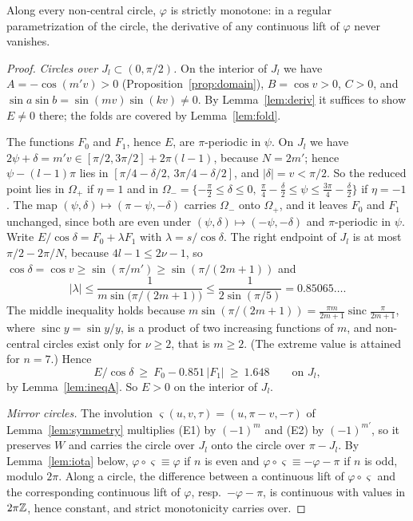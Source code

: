 \begin{theorem}\label{thm:noncentral}
Along every non-central circle, $\varphi$ is strictly monotone: in a regular parametrization of the circle, the
derivative of any continuous lift of $\varphi$ never vanishes.
\end{theorem}

\begin{proof}
\emph{Circles over $J_l\subset(0,\pi/2)$.} On the interior of $J_l$ we have $A=-\cos(m'v)>0$ (Proposition~\ref{prop:domain}),
$B=\cos v>0$, $C>0$, and $\sin a\sin b=\sin(mv)\sin(kv)\neq0$. By Lemma~\ref{lem:deriv} it suffices to show $E\neq0$ there;
the folds are covered by Lemma~\ref{lem:fold}.

The functions $F_0$ and $F_1$, hence $E$, are $\pi$-periodic in $\psi$. On $J_l$ we have
$2\psi+\delta=m'v\in[\pi/2,3\pi/2]+2\pi(l-1)$, because $N=2m'$; hence $\psi-(l-1)\pi$ lies in
$[\pi/4-\delta/2,\,3\pi/4-\delta/2]$, and $|\delta|=v<\pi/2$. So the reduced point lies in $\Omega_+$ if $\eta=1$ and in
$\Omega_-=\{-\frac\pi2\le\delta\le0,\ \frac\pi4-\frac\delta2\le\psi\le\frac{3\pi}4-\frac\delta2\}$ if $\eta=-1$. The map $(\psi,\delta)\mapsto(\pi-\psi,-\delta)$
carries $\Omega_-$ onto $\Omega_+$, and it leaves $F_0$ and $F_1$ unchanged, since both are even under
$(\psi,\delta)\mapsto(-\psi,-\delta)$ and $\pi$-periodic in $\psi$. Write $E/\cos\delta=F_0+\lambda F_1$ with $\lambda=s/\cos\delta$. The right endpoint of $J_l$ is at most
$\pi/2-2\pi/N$, because $4l-1\le2\nu-1$, so $\cos\delta=\cos v\ge\sin(\pi/m')\ge\sin(\pi/(2m+1))$ and
\[
|\lambda|\le\frac{1}{m\sin\bigl(\pi/(2m+1)\bigr)}\le\frac{1}{2\sin(\pi/5)}=0.85065\ldots .
\]
The middle inequality holds because $m\sin(\pi/(2m+1))=\frac{\pi m}{2m+1}\operatorname{sinc}\frac{\pi}{2m+1}$, where $\operatorname{sinc}y=\sin y/y$,
is a product of two increasing functions of $m$, and non-central circles exist only for $\nu\ge2$, that is $m\ge2$. (The extreme value
is attained for $n=7$.) Hence
\[
E/\cos\delta\ \ge\ F_0-0.851\,|F_1|\ \ge\ 1.648\qquad\text{on }J_l,
\]
by Lemma~\ref{lem:ineqA}. So $E>0$ on the interior of $J_l$.

\emph{Mirror circles.} The involution $\varsigma(u,v,\tau)=(u,\pi-v,-\tau)$ of Lemma~\ref{lem:symmetry} multiplies (E1) by
$(-1)^m$ and (E2) by $(-1)^{m'}$, so it preserves $W$ and carries the circle over $J_l$ onto the circle over $\pi-J_l$. By
Lemma~\ref{lem:iota} below, $\varphi\circ\varsigma\equiv\varphi$ if $n$ is even and $\varphi\circ\varsigma\equiv-\varphi-\pi$ if $n$ is odd,
modulo $2\pi$. Along a circle, the difference between a continuous lift of $\varphi\circ\varsigma$ and the corresponding
continuous lift of $\varphi$, resp.\ $-\varphi-\pi$, is continuous with values in $2\pi\mathbb{Z}$, hence constant, and strict
monotonicity carries over.
\end{proof}

